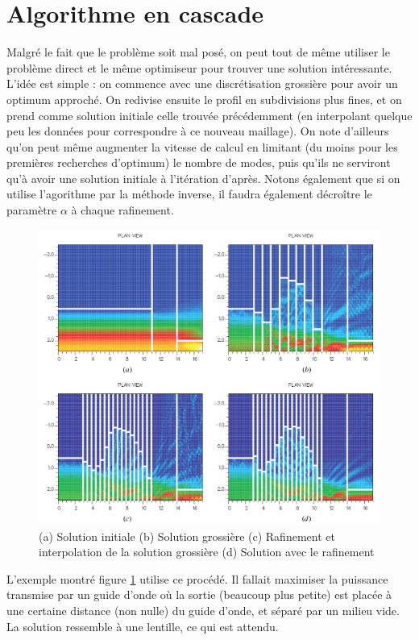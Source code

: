 \documentclass{article}
\begin{document}
\section{Algorithme en cascade}
Malgré le fait que le problème soit mal posé, on peut tout de même utiliser le problème direct et le même optimiseur pour trouver une solution intéressante.\\
L'idée est simple : on commence avec une discrétisation grossière pour avoir un optimum approché. On redivise ensuite le profil en subdivisions plus fines, et on prend comme solution initiale celle trouvée précédemment (en interpolant quelque peu les données pour correspondre à ce nouveau maillage). On note d'ailleurs qu'on peut même augmenter la vitesse de calcul en limitant (du moins pour les premières recherches d'optimum) le nombre de modes, puis qu'ils ne serviront qu'à avoir une solution initiale à l'itération d'après. Notons également que si on utilise l'agorithme par la méthode inverse, il faudra également décroître le paramètre $\alpha$ à chaque rafinement.\\
\begin{figure}[!h]
	\centering
	\includegraphics[scale=0.35]{images/cascade.png}
	\caption{(a) Solution initiale (b) Solution grossière (c) Rafinement et interpolation de la solution grossière (d) Solution avec le rafinement}
	\label{fig:cascade}
\end{figure}
L'exemple montré figure \ref{fig:cascade} utilise ce procédé. Il fallait maximiser la puissance transmise par un guide d'onde où la sortie (beaucoup plus petite) est placée à une certaine distance (non nulle) du guide d'onde, et séparé par un milieu vide. La solution ressemble à une lentille, ce qui est attendu. 



\end{document}
